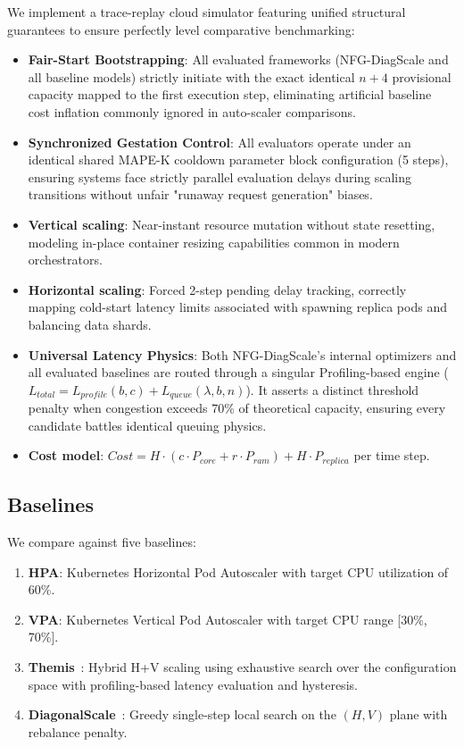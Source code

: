 \documentclass[conference]{IEEEtran}
\begin{document}
We implement a trace-replay cloud simulator featuring unified structural guarantees to ensure perfectly level comparative benchmarking:
\begin{itemize}
    \item \textbf{Fair-Start Bootstrapping}: All evaluated frameworks (NFG-DiagScale and all baseline models) strictly initiate with the exact identical $n+4$ provisional capacity mapped to the first execution step, eliminating artificial baseline cost inflation commonly ignored in auto-scaler comparisons.
    \item \textbf{Synchronized Gestation Control}: All evaluators operate under an identical shared MAPE-K cooldown parameter block configuration (5 steps), ensuring systems face strictly parallel evaluation delays during scaling transitions without unfair "runaway request generation" biases.
    \item \textbf{Vertical scaling}: Near-instant resource mutation without state resetting, modeling in-place container resizing capabilities common in modern orchestrators.
    \item \textbf{Horizontal scaling}: Forced 2-step pending delay tracking, correctly mapping cold-start latency limits associated with spawning replica pods and balancing data shards.
    \item \textbf{Universal Latency Physics}: Both NFG-DiagScale's internal optimizers and all evaluated baselines are routed through a singular Profiling-based engine ($L_{total} = L_{profile}(b,c) + L_{queue}(\lambda, b, n)$). It asserts a distinct threshold penalty when congestion exceeds 70\% of theoretical capacity, ensuring every candidate battles identical queuing physics.
    \item \textbf{Cost model}: $Cost = H \cdot (c \cdot P_{core} + r \cdot P_{ram}) + H \cdot P_{replica}$ per time step.
\end{itemize}

\subsection{Baselines}

We compare against five baselines:
\begin{enumerate}
    \item \textbf{HPA}: Kubernetes Horizontal Pod Autoscaler with target CPU utilization of 60\%.
    \item \textbf{VPA}: Kubernetes Vertical Pod Autoscaler with target CPU range [30\%, 70\%].
    \item \textbf{Themis}~\cite{razavi2024tale}: Hybrid H+V scaling using exhaustive search over the configuration space with profiling-based latency evaluation and hysteresis.
    \item \textbf{DiagonalScale}~\cite{abdullah2025diagonal}: Greedy single-step local search on the $(H,V)$ plane with rebalance penalty.
\end{enumerate}
\end{document}
